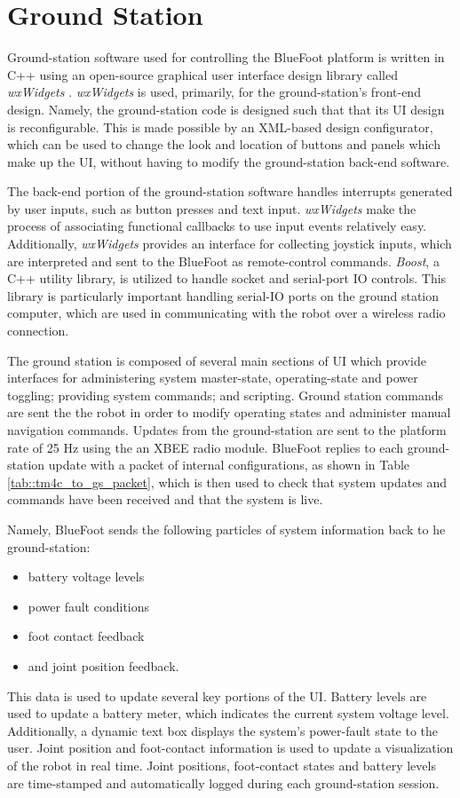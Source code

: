 	\section{Ground Station}
		
		Ground-station software used for controlling the BlueFoot platform is written in C++ using an open-source graphical user interface design library called \emph{wxWidgets} \cite{WX_Website}. \emph{wxWidgets} is used, primarily, for the ground-station's front-end design. Namely, the ground-station code is designed such that that its UI design is reconfigurable. This is made possible by an XML-based design configurator, which can be used to change the look and location of buttons and panels which make up the UI, without having to modify the ground-station back-end software. 

		The back-end portion of the ground-station software handles interrupts generated by user inputs, such as button presses and text input. \emph{wxWidgets} make the process of associating functional callbacks to use input events relatively easy. Additionally, \emph{wxWidgets} provides an interface for collecting joystick inputs, which are interpreted and sent to the BlueFoot as remote-control commands. \emph{Boost}, a C++ utility library, is utilized to handle socket and serial-port IO controls. This library is particularly important handling serial-IO ports on the ground station computer, which are used in communicating with the robot over a wireless radio connection.

		The ground station is composed of several main sections of UI which provide interfaces for administering system master-state, operating-state and power toggling; providing system commands; and scripting. Ground station commands are sent the the robot in order to modify operating states and administer manual navigation commands. Updates from the ground-station are sent to the platform rate of 25 Hz using the an XBEE radio module. BlueFoot replies to each ground-station update with a packet of internal configurations, as shown in Table \ref{tab::tm4c_to_gs_packet}, which is then used to check that system updates and commands have been received and that the system is live.

		Namely, BlueFoot sends the following particles of system information back to he ground-station: 
		\begin{itemize}
			\item battery voltage levels 
			\item power fault conditions 
			\item foot contact feedback
			\item and joint position feedback. 
		\end{itemize}
		This data is used to update several key portions of the UI. Battery levels are used to update a battery meter, which indicates the current system voltage level. Additionally, a dynamic text box displays the system's power-fault state to the user. Joint position and foot-contact information is used to update a visualization of the robot in real time. Joint positions, foot-contact states and battery levels are time-stamped and automatically logged during each ground-station session. 

